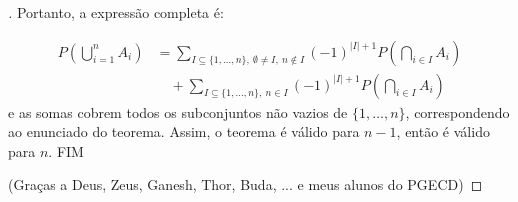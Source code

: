 \begin{frame}
	\begin{proof}[]	
		Portanto, a expressão completa é:
		
		\[
		\begin{aligned}
			P\left( \bigcup_{i=1}^{n} A_i \right) &= \sum_{I \subseteq \{1,\ldots,n\},\ \emptyset \ne I,\ n \notin I} (-1)^{|I|+1} P\left( \bigcap_{i \in I} A_i \right) \\
			&\quad + \sum_{I \subseteq \{1,\ldots,n\},\ n \in I} (-1)^{|I|+1} P\left( \bigcap_{i \in I} A_i \right)
		\end{aligned}
		\]
e as somas cobrem todos os subconjuntos não vazios de \( \{1,\ldots,n\} \), correspondendo ao enunciado do teorema.	Assim,  o teorema é válido para \( n - 1 \), então é válido para \( n \).	 FIM 

\bigskip
(Graças a Deus, Zeus, Ganesh, Thor, Buda, ... e meus alunos do PGECD)
\end{proof}
\end{frame}
		
